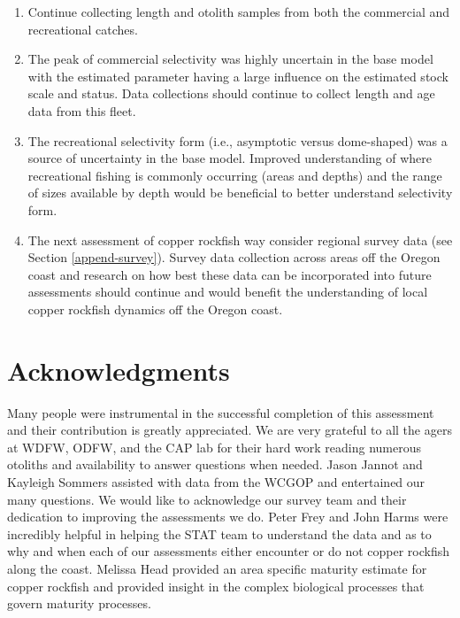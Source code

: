 \documentclass[11pt,
  english,
  a4paper,
]{article}
\begin{document}
\leavevmode\tagmcend\tagstructend\par

\begin{enumerate}

    \item Continue collecting length and otolith samples from both the commercial and recreational catches. 

    \item The peak of commercial selectivity was highly uncertain in the base model with the estimated parameter having a large influence on the estimated stock scale and status. Data collections should continue to collect length and age data from this fleet. 

    \item The recreational selectivity form (i.e., asymptotic versus dome-shaped) was a source of uncertainty in the base model. Improved understanding of where recreational fishing is commonly occurring (areas and depths) and the range of sizes available by depth would be beneficial to better understand selectivity form.  

    \item The next assessment of copper rockfish way consider regional survey data (see Section \ref{append-survey}). Survey data collection across areas off the Oregon coast and research on how best these data can be incorporated into future assessments should continue and would benefit the understanding of local copper rockfish dynamics off the Oregon coast. 

\end{enumerate}


\hypertarget{acknowledgments}{%
\section{Acknowledgments}\label{acknowledgments}}

\leavevmode\tagmcend\tagstructend


Many people were instrumental in the successful completion of this assessment and their contribution is greatly appreciated. We are very grateful to all the agers at WDFW, ODFW, and the CAP lab for their hard work reading numerous otoliths and availability to answer questions when needed. Jason Jannot and Kayleigh Sommers assisted with data from the WCGOP and entertained our many questions. We would like to acknowledge our survey team and their dedication to improving the assessments we do. Peter Frey and John Harms were incredibly helpful in helping the STAT team to understand the data and as to why and when each of our assessments either encounter or do not copper rockfish along the coast. Melissa Head provided an area specific maturity estimate for copper rockfish and provided insight in the complex biological processes that govern maturity processes.
\end{document}
